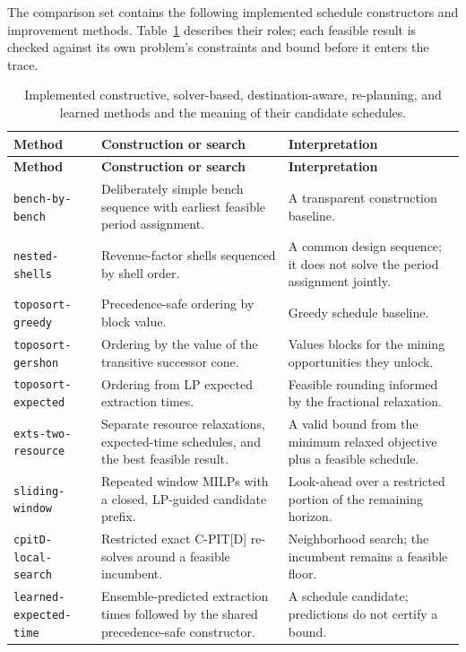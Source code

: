 \documentclass[11pt]{article}
\begin{document}
The comparison set contains the following implemented schedule constructors and improvement methods. Table~\ref{tab:method-summary} describes their roles; each feasible result is checked against its own problem's constraints and bound before it enters the trace.
{\small
\setlength{\tabcolsep}{4pt}
\begin{longtable}{>{\raggedright\arraybackslash}p{}>{\raggedright\arraybackslash}p{}>{\raggedright\arraybackslash}p{}}
\caption{Implemented constructive, solver-based, destination-aware, re-planning, and learned methods and the meaning of their candidate schedules.}\label{tab:method-summary}\\
\toprule
\textbf{Method} & \textbf{Construction or search} & \textbf{Interpretation}\\
\midrule
\endfirsthead
\toprule\textbf{Method} & \textbf{Construction or search} & \textbf{Interpretation}\\\midrule
\endhead
\texttt{bench-by-bench} & Deliberately simple bench sequence with earliest feasible period assignment. & A transparent construction baseline.\\
\texttt{nested-shells} & Revenue-factor shells sequenced by shell order. & A common design sequence; it does not solve the period assignment jointly.\\
\texttt{toposort-greedy} & Precedence-safe ordering by block value. & Greedy schedule baseline.\\
\texttt{toposort-gershon} & Ordering by the value of the transitive successor cone. & Values blocks for the mining opportunities they unlock.\\
\texttt{toposort-expected} & Ordering from LP expected extraction times. & Feasible rounding informed by the fractional relaxation.\\
\texttt{exts-two-resource} & Separate resource relaxations, expected-time schedules, and the best feasible result. & A valid bound from the minimum relaxed objective plus a feasible schedule.\\
\texttt{sliding-window} & Repeated window MILPs with a closed, LP-guided candidate prefix. & Look-ahead over a restricted portion of the remaining horizon.\\
\texttt{cpitD-local-search} & Restricted exact C-PIT[D] re-solves around a feasible incumbent. & Neighborhood search; the incumbent remains a feasible floor.\\
\texttt{learned-\allowbreak expected-\allowbreak time} & Ensemble-predicted extraction times followed by the shared precedence-safe constructor. & A schedule candidate; predictions do not certify a bound.\\

\end{longtable}}
\end{document}
